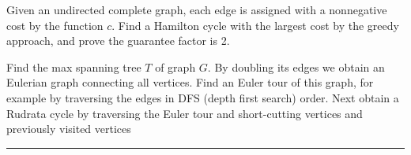 \documentclass[twoside]{article}
\newenvironment{problem}[2][Problem]{\begin{trivlist}
		\item[\hskip \labelsep {\bfseries #1}\hskip \labelsep {\bfseries #2.}]}{\end{trivlist}}
\newenvironment{solution}{{\bf Solution:}}{\hfill\rule{2mm}{2mm}}
\begin{document}
\begin{problem}{6}
Given an undirected complete graph, each edge is assigned with a nonnegative cost by the function $c$. Find a Hamilton cycle with the largest cost by the greedy approach, and prove the guarantee factor
is 2.

\end{problem} 
\begin{solution}
	
Find the max spanning tree $T$ of graph $G$. By doubling its edges we obtain
an Eulerian graph connecting all vertices. Find an Euler tour of this graph, for example by traversing the edges in DFS (depth first search) order. Next obtain a Rudrata cycle by traversing the Euler tour and short-cutting vertices and previously visited vertices
\end{solution}
\end{document}
